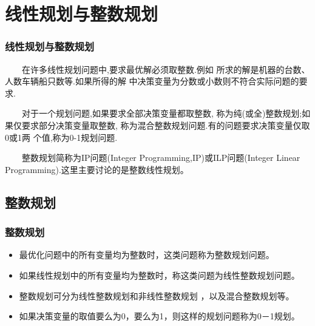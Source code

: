 \documentclass[slidestop,compress,mathserif,c]{beamer}
\begin{document}
\section{线性规划与整数规划}
\begin{frame}
\frametitle{线性规划与整数规划}
~~~~在许多线性规划问题中,要求最优解必须取整数.例如
所求的解是机器的台数、人数车辆船只数等.如果所得的解
中决策变量为分数或小数则不符合实际问题的要求.

~~~~对于一个规划问题,如果要求全部决策变量都取整数,
称为纯(或全)整数规划;如果仅要求部分决策变量取整数,
称为混合整数规划问题.有的问题要求决策变量仅取0或1两
个值,称为0-1规划问题.

~~~~整数规划简称为IP问题(Integer Programming,IP)或ILP问题(Integer Linear Programming).这里主要讨论的是整数线性规划。

\end{frame}

\subsection{\hfill 整数规划}
\begin{frame}
\frametitle{整数规划}
\begin{itemize}
\item 最优化问题中的所有变量均为整数时，这类问题称为整数规划问题。
\item 如果线性规划中的所有变量均为整数时，称这类问题为线性整数规划问题。
\item 整数规划可分为线性整数规划和非线性整数规划 ，以及混合整数规划等。
\item 如果决策变量的取值要么为0，要么为1，则这样的规划问题称为0－1规划。
\end{itemize}
\end{frame}

%
\end{document}
